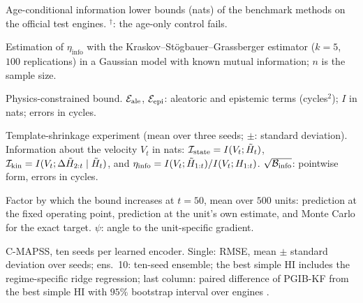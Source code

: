 \documentclass[preprint,12pt]{elsarticle}
\theoremstyle{definition}
\newcommand{\etaPIE}{\eta_{\mathrm{info}}}
\begin{document}
\begin{table}[!htbp]
\caption{Age-conditional information lower bounds (nats) of the benchmark methods on the official test engines. $^\dagger$: the age-only control fails.}
\centering\scriptsize
{}
\label{tab:rdtests}
\end{table}

\begin{table}
\caption{Estimation of $\etaPIE$ with the Kraskov--St\"ogbauer--Grassberger estimator ($k=5$, $100$ replications) in a Gaussian model with known mutual information; $n$ is the sample size.}
\centering\small

\label{tab:exp5s}
\end{table}


\begin{table}
\caption{Physics-constrained bound. $\mathcal E_{\rm ale}$, $\mathcal E_{\rm epi}$: aleatoric and epistemic terms (cycles$^2$); $I$ in nats; errors in cycles.}
\centering\small
{}
\label{tab:exp2}
\end{table}

\begin{table}
\caption{Template-shrinkage experiment (mean over three seeds; $\pm$: standard deviation). Information about the velocity $V_t$ in nats: $\mathcal I_{\rm state}=I(V_t;\tilde H_t)$, $\mathcal I_{\rm kin}=I(V_t;\Delta\tilde H_{2:t}\mid\tilde H_t)$, and $\eta_{\rm info}=I(V_t;\tilde H_{1:t})/I(V_t;H_{1:t})$. $\sqrt{\mathcal B_{\rm info}}$: pointwise form, errors in cycles.}
\centering
\small

\label{tab:exp1}
\end{table}

\begin{table}
\caption{Factor by which the bound increases at $t=50$, mean over $500$ units: prediction at the fixed operating point, prediction at the unit's own estimate, and Monte Carlo for the exact target. $\psi$: angle to the unit-specific gradient.}
\centering\small

\label{tab:exp3}
\end{table}

\begin{table}
\caption{C-MAPSS, ten seeds per learned encoder. Single: RMSE, mean $\pm$ standard deviation over seeds; ens.\ 10: ten-seed ensemble; the best simple HI includes the regime-specific ridge regression; last column: paired difference of PGIB-KF from the best simple HI with $95\%$ bootstrap interval over engines \cite{efron1993}.}
\centering\small
{}
\label{tab:var10}
\end{table}
\end{document}
